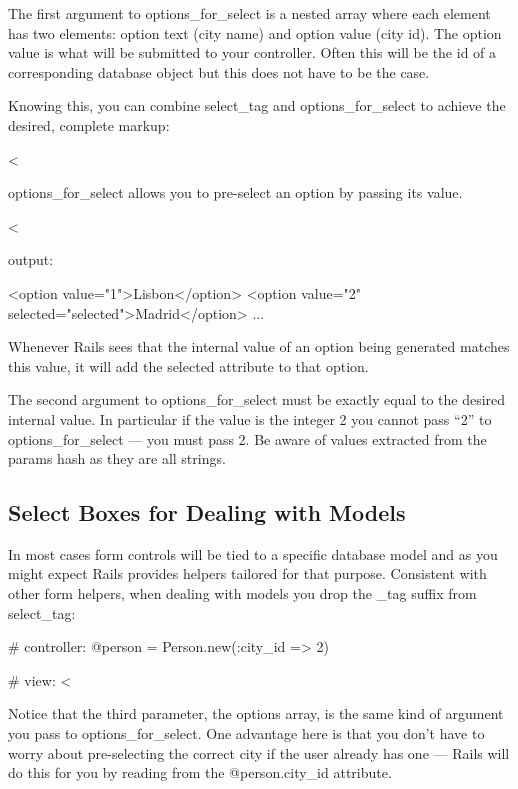 \documentclass[10pt]{book}
\newenvironment{code}{%
  \scriptsize
    \verbatim
}{%
    \endverbatim
    \newline
}
\begin{document}
The first argument to options\_for\_select is a nested array  where each element has two elements: option text (city name) and option  value (city id). The option value is what will be submitted to your  controller. Often this will be the id of a corresponding database object  but this does not have to be the case.

Knowing this, you can combine select\_tag and options\_for\_select to achieve the desired, complete markup:
\begin{code}
<%
\end{code}

options\_for\_select allows you to pre-select an option by passing its value.
\begin{code}
<%
 
output:
 
<option value="1">Lisbon</option>
<option value="2" selected="selected">Madrid</option>
...
\end{code}

Whenever Rails sees that the internal value of an option being generated matches this value, it will add the selected attribute to that option.

The second argument to options\_for\_select must be exactly equal to the desired internal value. In particular if the value is the integer 2 you cannot pass “2” to options\_for\_select — you must pass 2. Be aware of values extracted from the params hash as they are all strings.

\subsection{ Select Boxes for Dealing with Models}

In most cases form controls will be tied to a specific database model  and as you might expect Rails provides helpers tailored for that  purpose. Consistent with other form helpers, when dealing with models  you drop the \_tag suffix from select\_tag:
\begin{code}
# controller:
@person = Person.new(:city_id => 2)
\end{code}
\begin{code}
# view:
<%
\end{code}

Notice that the third parameter, the options array, is the same kind of argument you pass to options\_for\_select.  One advantage here is that you don’t have to worry about pre-selecting  the correct city if the user already has one — Rails will do this for  you by reading from the @person.city\_id attribute.
\end{document}

